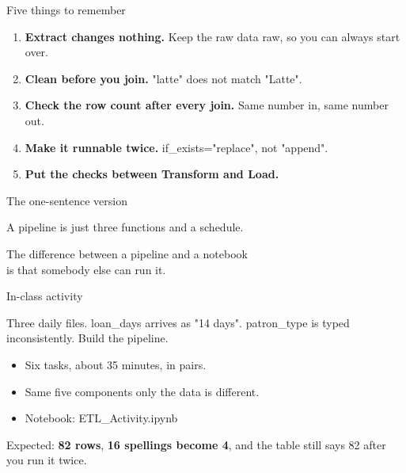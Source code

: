 \documentclass[aspectratio=169,10pt]{beamer}
\newcommand{\py}[1]{{\ttfamily\footnotesize\color{ink}#1}}
\begin{document}
\begin{frame}{Five things to remember}
  \begin{enumerate}[<+->]
    \item \textbf{Extract changes nothing.} Keep the raw data raw, so you can always start over.
    \item \textbf{Clean before you join.} \py{"latte"} does not match \py{"Latte"}.
    \item \textbf{Check the row count after every join.} Same number in, same number out.
    \item \textbf{Make it runnable twice.} \py{if\_exists="replace"}, not \py{"append"}.
    \item \textbf{Put the checks between Transform and Load.}
  \end{enumerate}
\end{frame}

\begin{frame}{The one-sentence version}
  \vfill
  \begin{center}
    {\large A pipeline is just \alert{three functions and a schedule}.}
  \end{center}
  \pause
  \vfill
  \begin{center}
    {\large The difference between a pipeline and a notebook\\[4pt]
     is that \alert{somebody else can run it}.}
  \end{center}
  \vfill
\end{frame}

\begin{frame}{In-class activity}
  \begin{exmp}[title=Founders Library checkouts]
    \small
    Three daily files. \py{loan\_days} arrives as \py{"14 days"}. \py{patron\_type} is typed
    inconsistently. Build the pipeline.
  \end{exmp}

  \pause
  \begin{itemize}[<+->]
    \item Six tasks, about 35 minutes, in pairs.
    \item Same five components \textemdash{} only the data is different.
    \item Notebook: \py{ETL\_Activity.ipynb}
  \end{itemize}

  \pause\vfill
  \begin{prac}
    \small
    Expected: \textbf{82 rows}, \textbf{16 spellings become 4}, and the table still says 82 after you
    run it twice.
  \end{prac}
\end{frame}
\end{document}

